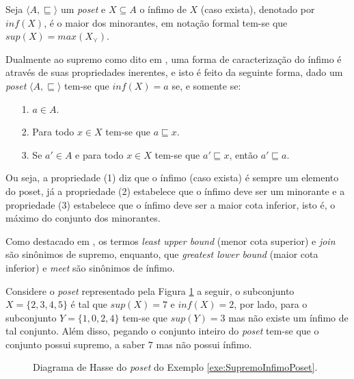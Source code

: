 \begin{definition}[Ínfimo]\label{def:Infimo}
	Seja $\langle A, \sqsubseteq \rangle$ um \textit{poset} e $X \subseteq A$ o ínfimo de $X$ (caso exista), denotado por $inf(X)$, é o maior dos minorantes, em notação formal tem-se que $sup(X) = max(X_\curlyvee)$.
\end{definition}

Dualmente ao supremo como dito em \cite{abe1991-TC, carmo2013}, uma forma de caracterização do ínfimo é através de suas propriedades inerentes, e isto é feito da seguinte forma, dado um \textit{poset} $\langle A, \sqsubseteq \rangle$ tem-se que $inf(X) = a $ se, e somente se:

\begin{itemize}
	\item[1.] $a \in A$.
	\item[2.] Para todo $x \in X$ tem-se que $a \sqsubseteq x$.
	\item[3.] Se $a' \in A$ e para todo $x \in X$ tem-se que  $a' \sqsubseteq x$, então $a' \sqsubseteq a$.
\end{itemize}

Ou seja, a propriedade (1) diz que o ínfimo (caso exista) é sempre um elemento do poset, já a propriedade (2) estabelece que o  ínfimo deve ser um minorante e a propriedade (3) estabelece que o  ínfimo deve ser a maior cota inferior, isto é, o máximo do conjunto dos minorantes.

\begin{remark}
	Como destacado em \cite{fmcbook}, os termos \textit{least upper bound} (menor cota superior) e \textit{join} são sinônimos de supremo, enquanto, que \textit{greatest lower bound} (maior cota inferior) e \textit{meet} são sinônimos de ínfimo.
\end{remark}

\begin{example}\label{exe:SupremoInfimoPoset}
	Considere o \textit{poset} representado pela Figura \ref{fig:DiagramaHasse10} a seguir, o subconjunto $X = \{2, 3, 4, 5\}$ é tal que $sup(X) = 7$ e $inf(X) = 2$, por lado, para o subconjunto $Y = \{1, 0, 2, 4\}$ tem-se que $sup(Y) = 3$ mas não existe um ínfimo de tal conjunto. Além disso, pegando o conjunto inteiro do \textit{poset} tem-se que o conjunto possui supremo, a saber $7$ mas não possui ínfimo. 
	
	\begin{figure}[h]
		\centering
		\caption{Diagrama de Hasse do \textit{poset} do Exemplo \ref{exe:SupremoInfimoPoset}.}
		\label{fig:DiagramaHasse10}
	\end{figure}
\end{example}

